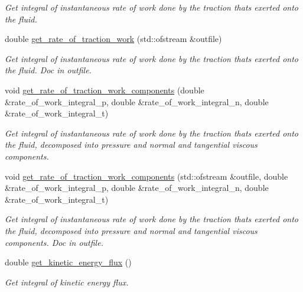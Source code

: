 \begin{DoxyCompactItemize}
\begin{DoxyCompactList}\small\item\em Get integral of instantaneous rate of work done by the traction that\textquotesingle{}s exerted onto the fluid. \end{DoxyCompactList}\item 
double \hyperlink{classoomph_1_1NavierStokesSurfacePowerElement_aa46d2bfef7537d540c1103e6d832d8c1}{get\+\_\+rate\+\_\+of\+\_\+traction\+\_\+work} (std\+::ofstream \&outfile)
\begin{DoxyCompactList}\small\item\em Get integral of instantaneous rate of work done by the traction that\textquotesingle{}s exerted onto the fluid. Doc in outfile. \end{DoxyCompactList}\item 
void \hyperlink{classoomph_1_1NavierStokesSurfacePowerElement_a37fb9f362e6be61c0e0c8c75d07cf9ee}{get\+\_\+rate\+\_\+of\+\_\+traction\+\_\+work\+\_\+components} (double \&rate\+\_\+of\+\_\+work\+\_\+integral\+\_\+p, double \&rate\+\_\+of\+\_\+work\+\_\+integral\+\_\+n, double \&rate\+\_\+of\+\_\+work\+\_\+integral\+\_\+t)
\begin{DoxyCompactList}\small\item\em Get integral of instantaneous rate of work done by the traction that\textquotesingle{}s exerted onto the fluid, decomposed into pressure and normal and tangential viscous components. \end{DoxyCompactList}\item 
void \hyperlink{classoomph_1_1NavierStokesSurfacePowerElement_abb4f14e2d8a0f79f9ab678c6ae9ae049}{get\+\_\+rate\+\_\+of\+\_\+traction\+\_\+work\+\_\+components} (std\+::ofstream \&outfile, double \&rate\+\_\+of\+\_\+work\+\_\+integral\+\_\+p, double \&rate\+\_\+of\+\_\+work\+\_\+integral\+\_\+n, double \&rate\+\_\+of\+\_\+work\+\_\+integral\+\_\+t)
\begin{DoxyCompactList}\small\item\em Get integral of instantaneous rate of work done by the traction that\textquotesingle{}s exerted onto the fluid, decomposed into pressure and normal and tangential viscous components. Doc in outfile. \end{DoxyCompactList}\item 
double \hyperlink{classoomph_1_1NavierStokesSurfacePowerElement_a69225bd43c0e0552beeab3013a59968e}{get\+\_\+kinetic\+\_\+energy\+\_\+flux} ()
\begin{DoxyCompactList}\small\item\em Get integral of kinetic energy flux. \end{DoxyCompactList}\item 

\end{DoxyCompactItemize}
